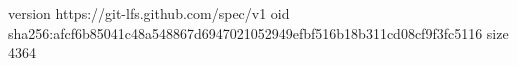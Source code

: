 version https://git-lfs.github.com/spec/v1
oid sha256:afcf6b85041c48a548867d6947021052949efbf516b18b311cd08cf9f3fc5116
size 4364
